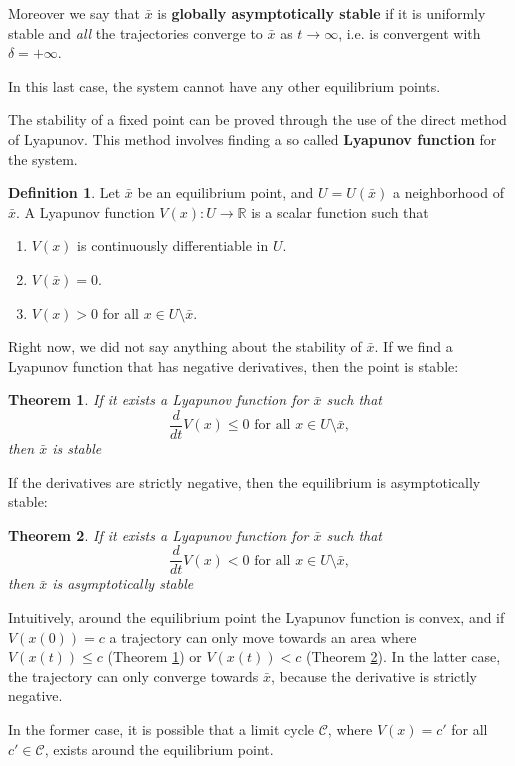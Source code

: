 \documentclass[oneside]{book}
\newcommand{\R}{\mathbb{R}}
\theoremstyle{definition}
\newtheorem{defn}{Definition}
\theoremstyle{plain}
\newtheorem{teo}{Theorem}
\begin{document}
Moreover we say that $\bar x$ is \textbf{globally asymptotically stable} if it is uniformly stable and \textit{all} the trajectories converge to $\bar x$ as $t\to \infty$, i.e. is convergent with $\delta=+\infty$.

In this last case,  the system cannot have any other equilibrium points.

The stability of a fixed point can be proved through the use of the direct method of Lyapunov. This method involves finding a so called \textbf{Lyapunov function } for the system.
\begin{defn}
    Let $\bar x$ be an equilibrium point, and $U=U(\bar x)$ a neighborhood of $\bar x$. A Lyapunov function $V(x): U\to \R$ is a scalar function such that
    \begin{enumerate}
        \item $V(x)$ is continuously differentiable in $U$.
        \item $V(\bar x)=0$.
        \item $V(x)>0$ for all $x\in U\setminus \bar x$.
    \end{enumerate}
\end{defn}
Right now, we did not say anything about the stability of $\bar x$. If we find a Lyapunov function that has negative derivatives, then the point is stable:
\begin{teo} \label{theo:lyap1}
    If it exists a Lyapunov function for $\bar x$ such that 
    \[
        \frac{d}{dt}V(x)\leq 0 \text{ for all $x\in U\setminus \bar x$},
    \]
    then $\bar x$ is stable
\end{teo}

If the derivatives are strictly negative, then the equilibrium is asymptotically stable:
\begin{teo}\label{theo:lyap2}
    If it exists a Lyapunov function for $\bar x$ such that 
    \[
        \frac{d}{dt}V(x)< 0 \text{ for all $x\in U\setminus \bar x$},
    \]
    then $\bar x$ is asymptotically stable    
\end{teo}

Intuitively, around the equilibrium point the Lyapunov function is convex, and if $V(x(0))=c$ a trajectory can only move towards an area where $V(x(t))\leq c$ (Theorem \ref{theo:lyap1}) or $V(x(t))<c$ (Theorem \ref{theo:lyap2}). In the latter case, the trajectory can only converge towards $\bar x$, because the derivative is strictly negative. 

In the former case, it is possible that a limit cycle $\mathcal{C}$, where $V(x)=c'$ for all $c'\in \mathcal{C}$, exists around the equilibrium point.
\end{document}
